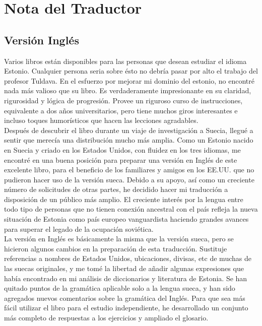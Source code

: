 \section*{Nota del Traductor}

\subsection*{Versión Inglés}

Varios libros están disponibles para las personas que desean estudiar el idioma Estonio. Cualquier persona seria sobre ésto no debría pasar por alto el trabajo del profesor Tuldava. En el esfuerzo por mejorar mi dominio del estonio, no encontré nada más valioso que su libro. Es verdaderamente impresionante en su claridad, rigurosidad y lógica de progresión. Provee un riguroso curso de instrucciones, equivalente a dos años universitarios, pero tiene muchos giros interesantes e incluso toques humorísticos que hacen las lecciones agradables.\\

Después de descubrir el libro durante un viaje de investigación a Suecia, llegué a sentir que merecía una distribución mucho más amplia. Como un Estonio nacido en Suecia y criado en los Estados Unidos, con fluidez en los tres idiomas, me encontré en una buena posición para preparar una versión en Inglés de este excelente libro, para el beneficio de los familiares y amigos en los EE.UU. que no pudieron hacer uso de la versión sueca. Debido a su apoyo, así como un creciente número de solicitudes de otras partes, he decidido hacer mi traducción a disposición de un público más amplio. El creciente interés por la lengua entre todo tipo de personas que no tienen conexión ancestral con el país refleja la nueva situación de Estonia como país europeo vanguardista haciendo grandes avances para superar el legado de la ocupación soviética.\\

La versión en Inglés es básicamente la misma que la versión sueca, pero se hicieron algunos cambios en la preparación de esta traducción. Sustituje referencias a nombres de Estados Unidos, ubicaciones, divisas, etc de muchas de las suecas originales, y me tomé la libertad de añadir algunas expresiones que había encontrado en mi análisis de diccionarios y literatura de Estonia. Se han quitado puntos de la gramática aplicable solo a la lengua sueca, y han sido agregados nuevos comentarios sobre la gramática del Inglés. Para que sea más fácil utilizar el libro para el estudio independiente, he desarrollado un conjunto más completo de respuestas a los ejercicios y ampliado el glosario.\\

